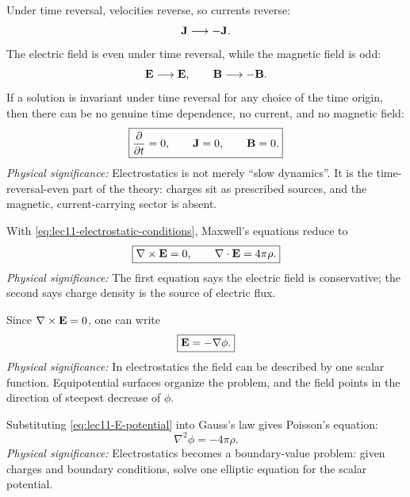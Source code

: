 Under time reversal, velocities reverse, so currents reverse:
\begin{equation}\label{eq:lec11-time-reversal-current}
  \mathbf{J} \longrightarrow -\mathbf{J} .
\end{equation}
The electric field is even under time reversal, while the magnetic field is odd:
\begin{equation}\label{eq:lec11-time-reversal-fields}
  \mathbf{E}\longrightarrow \mathbf{E},\qquad
  \mathbf{B}\longrightarrow -\mathbf{B} .
\end{equation}
If a solution is invariant under time reversal for any choice of the time origin,
then there can be no genuine time dependence, no current, and no magnetic field:
\begin{equation}\label{eq:lec11-electrostatic-conditions}
  \boxed{
  \pdv{}{t}=0,\qquad
  \mathbf{J}=0,\qquad
  \mathbf{B}=0 .
  }
\end{equation}
\textit{Physical significance:} Electrostatics is not merely ``slow dynamics''.
It is the time-reversal-even part of the theory: charges sit as prescribed sources,
and the magnetic, current-carrying sector is absent.

With \eqref{eq:lec11-electrostatic-conditions}, Maxwell's equations reduce to
\begin{equation}\label{eq:lec11-electrostatic-maxwell}
  \boxed{
  \nabla\times\mathbf{E}=0,\qquad
  \nabla\cdot\mathbf{E}=4\pi\rho .
  }
\end{equation}
\textit{Physical significance:} The first equation says the electric field is
conservative; the second says charge density is the source of electric flux.

Since $\nabla\times\mathbf{E}=0$, one can write
\begin{equation}\label{eq:lec11-E-potential}
  \boxed{
  \mathbf{E}=-\nabla\phi .
  }
\end{equation}
\textit{Physical significance:} In electrostatics the field can be described by
one scalar function.  Equipotential surfaces organize the problem, and the field
points in the direction of steepest decrease of $\phi$.

Substituting \eqref{eq:lec11-E-potential} into Gauss's law gives Poisson's equation:
\begin{equation}\label{eq:lec11-poisson}
  \boxed{
  \nabla^2\phi=-4\pi\rho .
  }
\end{equation}
\textit{Physical significance:} Electrostatics becomes a boundary-value problem:
given charges and boundary conditions, solve one elliptic equation for the scalar
potential.

